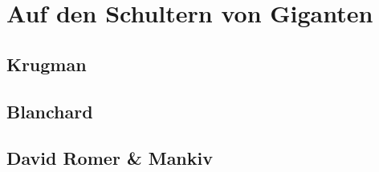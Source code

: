 \section{Auf den Schultern von Giganten}
\label{Giganten}

\subsection{Krugman}

\subsection{Blanchard}

\subsection{David Romer \& Mankiv}




